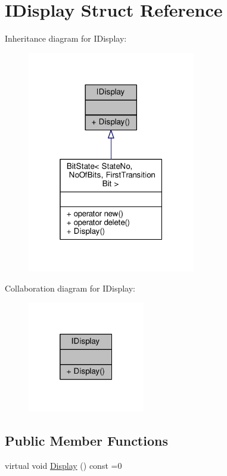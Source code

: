 \hypertarget{struct_i_display}{}\section{I\+Display Struct Reference}
\label{struct_i_display}


Inheritance diagram for I\+Display\+:
\nopagebreak
\begin{figure}[H]
\begin{center}
\leavevmode
\includegraphics[width=208pt]{struct_i_display__inherit__graph}
\end{center}
\end{figure}


Collaboration diagram for I\+Display\+:
\nopagebreak
\begin{figure}[H]
\begin{center}
\leavevmode
\includegraphics[width=145pt]{struct_i_display__coll__graph}
\end{center}
\end{figure}
\subsection*{Public Member Functions}
\begin{DoxyCompactItemize}
\item 
virtual void \mbox{\hyperlink{struct_i_display_a661bdbd2f3b46f7e0d8f8211a212f184}{Display}} () const =0
\end{DoxyCompactItemize}


